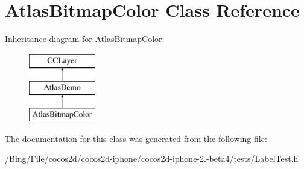 \hypertarget{interface_atlas_bitmap_color}{\section{Atlas\-Bitmap\-Color Class Reference}
\label{interface_atlas_bitmap_color}
}
Inheritance diagram for Atlas\-Bitmap\-Color\-:\begin{figure}[H]
\begin{center}
\leavevmode
\includegraphics[height=3.000000cm]{interface_atlas_bitmap_color}
\end{center}
\end{figure}


The documentation for this class was generated from the following file\-:\begin{DoxyCompactItemize}
\item 
/\-Bing/\-File/cocos2d/cocos2d-\/iphone/cocos2d-\/iphone-\/2.-\/beta4/tests/Label\-Test.\-h\end{DoxyCompactItemize}
